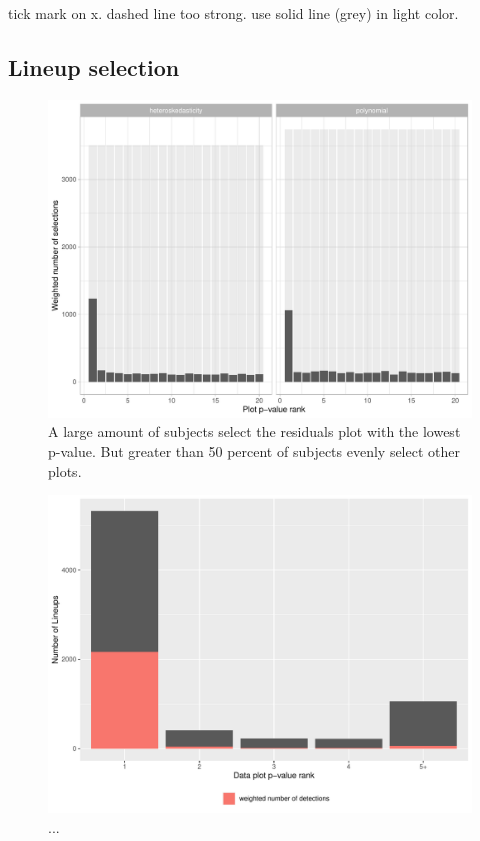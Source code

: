 \documentclass[]{interact}
\theoremstyle{plain}%
\theoremstyle{definition}
\theoremstyle{remark}
\begin{document}
tick mark on x. dashed line too strong. use solid line (grey) in light
color.

\hypertarget{lineup-selection}{%
\subsection{Lineup selection}\label{lineup-selection}}

\begin{figure}

{\centering \includegraphics[width=1\linewidth]{paper_comparison_files/figure-latex/plotsel-1} 

}

\caption{A large amount of subjects select the residuals plot with the lowest p-value. But greater than 50 percent of subjects evenly select other plots.}\label{fig:plotsel}
\end{figure}

\begin{figure}

{\centering \includegraphics[width=1\linewidth]{paper_comparison_files/figure-latex/dataplotsel-1} 

}

\caption{...}\label{fig:dataplotsel}
\end{figure}
\end{document}
